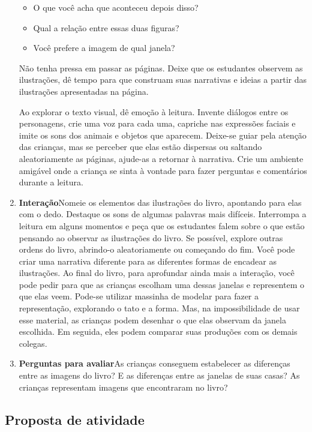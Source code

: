\documentclass[11pt]{extarticle}
\begin{document}
\begin{enumerate}
\begin{itemize}
\item O que você acha que aconteceu depois disso?
\item Qual a relação entre essas duas figuras?
\item Você prefere a imagem de qual janela?
\end{itemize}

Não tenha pressa em passar as páginas. Deixe que os estudantes 
observem as ilustrações, dê tempo para que construam suas narrativas e ideias 
a partir das ilustrações apresentadas na página.

Ao explorar o texto visual, dê emoção 
à leitura. Invente diálogos entre os personagens, crie uma voz para 
cada uma, capriche nas expressões faciais e imite os sons dos animais e objetos que aparecem.
Deixe-se guiar pela atenção das crianças, mas se perceber que 
elas estão dispersas ou saltando aleatoriamente as páginas, ajude-as 
a retornar à narrativa. Crie um ambiente amigável onde a criança 
se sinta à vontade para fazer perguntas e comentários durante a leitura.


\item \textbf{Interação}\quad Nomeie os elementos das ilustrações 
do livro, apontando para elas com o dedo. Destaque os sons de algumas 
palavras mais difíceis. Interrompa a leitura em alguns momentos e peça que 
os estudantes falem sobre o que estão pensando ao observar as ilustrações do livro.
Se possível, explore outras ordens do livro, abrindo-o aleatoriamente ou começando do fim.
Você pode criar uma narrativa diferente para as diferentes formas de encadear as ilustrações.
Ao final do livro, para aprofundar ainda mais a interação, você pode pedir para que as crianças escolham uma dessas janelas e representem o que elas veem. Pode-se utilizar massinha de modelar para fazer a representação, explorando o tato e a forma. Mas, na impossibilidade de usar esse material, as crianças podem desenhar o que elas observam da janela escolhida. Em seguida, eles podem comparar suas produções com os demais colegas.  


\item \textbf{Perguntas para avaliar}\quad As crianças conseguem estabelecer as diferenças entre as imagens do livro? E as diferenças entre as janelas de suas casas? As crianças representam imagens que encontraram no livro?  

\end{enumerate}


\subsection{Proposta de atividade}
\end{document}
